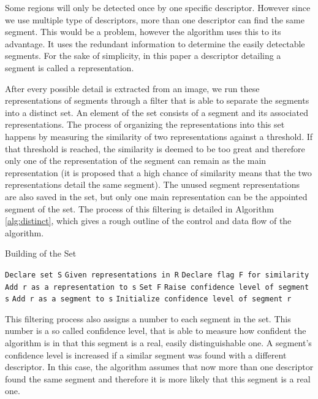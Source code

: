 Some regions will only be detected once by one specific descriptor. However since we use multiple type of descriptors, more than one descriptor can find the same segment. This would be a problem, however the algorithm uses this to its advantage. It uses the redundant information to determine the easily detectable segments. For the sake of simplicity, in this paper a descriptor detailing a segment is called a representation.

After every possible detail is extracted from an image, we run these representations of segments through a filter that is able to separate the segments into a distinct set. An element of the set consists of a segment and its associated representations. The process of organizing the representations into this set happens by measuring the similarity of two representations against a threshold. If that threshold is reached, the similarity is deemed to be too great and therefore only one of the representation of the segment can remain as the main representation (it is proposed that a high chance of similarity means that the two representations detail the same segment). The unused segment representations are also saved in the set, but only one main representation can be the appointed segment of the set. The process of this filtering is detailed in Algorithm \ref{alg:distinct}, which gives a rough outline of the control and data flow of the algorithm.
\begin{algorithm}[H]
\caption{Building of the Set}\label{alg:distinct}
\begin{algorithmic}
    \State \texttt{Declare set S}
    \State \texttt{Given representations in R}
        \State \texttt{Declare flag F for similarity}
                \State \texttt{Add r as a representation to s}
                \State \texttt{Set F}
                \State \texttt{Raise confidence level of segment s}
            \EndIf
        \EndFor
            \State \texttt{Add r as a segment to s}
            \State \texttt{Initialize confidence level of segment r}
        \EndIf
    \EndFor
\end{algorithmic}
\end{algorithm}


This filtering process also assigns a number to each segment in the set. This number is a so called confidence level, that is able to measure how confident the algorithm is in that this segment is a real, easily distinguishable one. A segment's confidence level is increased if a similar segment was found with a different descriptor. In this case, the algorithm assumes that now more than one descriptor found the same segment and therefore it is more likely that this segment is a real one. 

